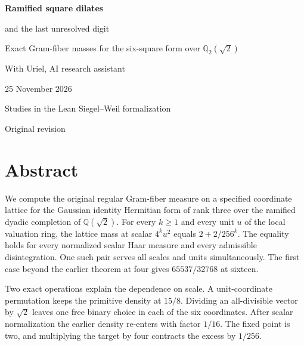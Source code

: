 \documentclass[12pt,letterpaper]{article}
\newcommand{\code}[1]{\texttt{\detokenize{#1}}}
\begin{document}
\thispagestyle{empty}
\begin{center}\par\vspace{.46in}
{\fontsize{30}{35}\selectfont\bfseries\color{ink}Ramified square dilates\par and the last unresolved digit}\par\vspace{.23in}
\begin{minipage}{.87\linewidth}\centering\Large Exact Gram-fiber masses for the six-square form over $\mathbb Q_2(\sqrt{2})$\end{minipage}
\par\vspace{.35in}
\par\vspace{.45in}{\large Justin Candler}\par With Uriel, AI research assistant\par 25 November 2026\end{center}\vfill
\begin{center}\sffamily Studies in the Lean Siegel--Weil formalization\par\small Original revision \code{40e56bab}\end{center}
\clearpage\section*{Abstract}
We compute the original regular Gram-fiber measure on a specified coordinate lattice for the Gaussian identity Hermitian form of rank three over the ramified dyadic completion of $\mathbb Q(\sqrt2)$. For every $k\ge1$ and every unit $u$ of the local valuation ring, the lattice mass at scalar $4^ku^2$ equals $2+2/256^k$. The equality holds for every normalized scalar Haar measure and every admissible disintegration. One such pair serves all scales and units simultaneously. The first case beyond the earlier theorem at four gives $65537/32768$ at sixteen.
\par
Two exact operations explain the dependence on scale. A unit-coordinate permutation keeps the primitive density at $15/8$. Dividing an all-divisible vector by $\sqrt2$ leaves one free binary choice in each of the six coordinates. After scalar normalization the earlier density re-enters with factor $1/16$. The fixed point is two, and multiplying the target by four contracts the excess by $1/256$.
\end{document}
